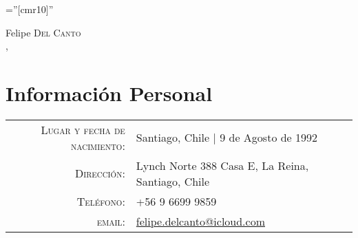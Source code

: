 \documentclass[a4paper,10pt]{article}
\begin{document}
\pagestyle{empty} %

\font\fb=''[cmr10]'' %

\par{\centering
		{{\Huge Felipe \textsc{Del Canto}}	\\
		 {\large \monthname, \the\year }
	}\par}

\section{Información Personal}

\begin{tabular}{rl}
    \textsc{Lugar y fecha de nacimiento:}	&	Santiago, Chile  | 9 de Agosto de 1992 \\
    \textsc{Dirección:}   				&	Lynch Norte 388 Casa E, La Reina, Santiago, Chile \\
    \textsc{Teléfono:}   				&	+56 9 6699 9859\\
    \textsc{email:}     					&	\href{mailto:felipe.delcanto@icloud.com}{felipe.delcanto@icloud.com}
\end{tabular}

\end{document}
